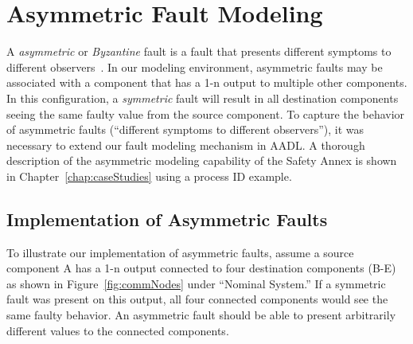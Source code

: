 \section{Asymmetric Fault Modeling}
\label{sec:byzantine}
A \textit{asymmetric} or \textit{Byzantine} fault is a fault that presents different symptoms to different observers~\cite{Driscoll-Byzantine-Fault}. In our modeling environment, asymmetric faults may be associated with a component that has a 1-n output to multiple other components. In this configuration, a \textit{symmetric} fault will result in all destination components seeing the same faulty value from the source component. To capture the behavior of asymmetric faults (``different symptoms to different observers''), it was necessary to extend our fault modeling mechanism in AADL. A thorough description of the asymmetric modeling capability of the Safety Annex is shown in Chapter~\ref{chap:caseStudies} using a process ID example.

\subsection{Implementation of Asymmetric Faults}
To illustrate our implementation of asymmetric faults, assume a source component A has a 1-n output connected to four destination components (B-E) as shown in Figure~\ref{fig:commNodes} under ``Nominal System.'' If a symmetric fault was present on this output, all four connected components would see the same faulty behavior. An asymmetric fault should be able to present arbitrarily different values to the connected components. 

